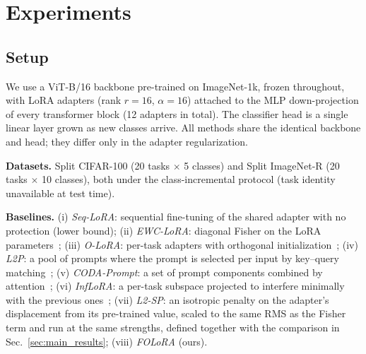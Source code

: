 
\section{Experiments}
\label{sec:experiments}

\subsection{Setup}
\label{sec:setup}
We use a ViT-B/16 backbone pre-trained on ImageNet-1k, frozen throughout, with LoRA
adapters (rank $r=16$, $\alpha=16$) attached to the MLP down-projection of every
transformer block (12 adapters in total). The classifier head is a single linear layer
grown as new classes arrive. All methods share the identical backbone and head; they
differ only in the adapter regularization.

\textbf{Datasets.} Split CIFAR-100 (20 tasks $\times$ 5 classes) and Split ImageNet-R
(20 tasks $\times$ 10 classes), both under the class-incremental protocol (task identity
unavailable at test time).

\textbf{Baselines.} (i) \emph{Seq-LoRA}: sequential fine-tuning of the shared adapter
with no protection (lower bound); (ii) \emph{EWC-LoRA}: diagonal Fisher on the LoRA
parameters~\cite{kirkpatrick2017overcoming}; (iii) \emph{O-LoRA}: per-task adapters with
orthogonal initialization~\cite{wang2023olora}; (iv) \emph{L2P}: a pool of prompts where the
prompt is selected per input by key--query matching~\cite{wang2022l2p}; (v) \emph{CODA-Prompt}: a set
of prompt components combined by attention~\cite{smith2023coda}; (vi) \emph{InfLoRA}: a
per-task subspace projected to interfere minimally with the previous
ones~\cite{liang2024inflora}; (vii) \emph{L2-SP}: an isotropic penalty on the adapter's
displacement from its pre-trained value, scaled to the same RMS as the Fisher term and run at
the same strengths, defined together with the comparison in Sec.~\ref{sec:main_results};
(viii) \emph{FOLoRA} (ours).

